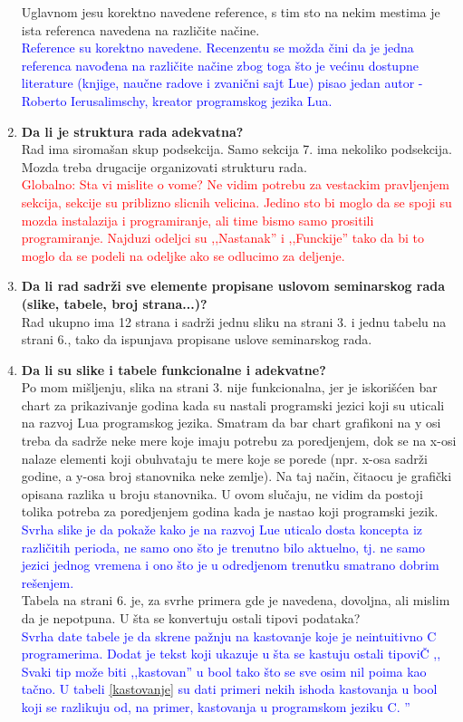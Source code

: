 \documentclass[a4paper]{report}
\newcommand{\odgovorAutora}[1]{\textcolor{blue}{#1}}
\newcommand{\note}[1]{\textcolor{red}{#1}}
\begin{document}
\begin{enumerate}
  Uglavnom jesu korektno navedene reference, s tim sto na nekim mestima je ista referenca navedena na razli\v cite na\v cine. \\
\odgovorAutora{Reference su korektno navedene. Recenzentu se možda čini da je jedna referenca navođena na različite načine zbog toga što je većinu dostupne literature (knjige, naučne radove i zvanični sajt Lue) pisao jedan autor - Roberto Ierusalimschy, kreator programskog jezika Lua.}
\item \textbf {Da li je struktura rada adekvatna?}\\
  Rad ima siroma\v san skup podsekcija. Samo sekcija 7. ima nekoliko podsekcija. Mozda treba drugacije organizovati strukturu rada. \\
\note{Globalno: Sta vi mislite o vome? Ne vidim potrebu za vestackim pravljenjem sekcija, sekcije su priblizno slicnih velicina. Jedino sto bi moglo da se spoji su mozda instalazija i programiranje, ali time bismo samo prositili programiranje. Najduzi odeljci su ,,Nastanak'' i ,,Funckije'' tako da bi to moglo da se podeli na odeljke ako se odlucimo za deljenje.}
\item \textbf {Da li rad sadrži sve elemente propisane uslovom seminarskog rada (slike, tabele, broj strana...)?}\\
  Rad ukupno ima 12 strana i sadr\v zi jednu sliku na strani 3. i jednu tabelu na strani 6., tako da ispunjava propisane uslove seminarskog rada.
\item \textbf {Da li su slike i tabele funkcionalne i adekvatne?}\\
  Po mom mi\v sljenju, slika na strani 3. nije funkcionalna, jer je iskori\v s\' cen bar chart za prikazivanje godina kada su nastali programski jezici koji su uticali na razvoj Lua programskog jezika. Smatram da bar chart grafikoni na y osi treba da sadr\v ze neke mere koje imaju potrebu za poredjenjem, dok se na x-osi nalaze elementi koji obuhvataju te mere koje se porede (npr. x-osa sadr\v zi godine, a y-osa broj stanovnika neke zemlje). Na taj na\v cin, \v citaocu je grafi\v cki opisana razlika u
    broju stanovnika. U ovom slu\v caju, ne vidim da postoji tolika potreba za poredjenjem godina kada je nastao koji programski jezik.\\
\odgovorAutora{Svrha slike je da pokaže kako je na razvoj Lue uticalo dosta koncepta iz različitih perioda, ne samo ono što je trenutno bilo aktuelno, tj. ne samo jezici jednog vremena i ono što je u odredjenom trenutku smatrano dobrim rešenjem.} \\
  Tabela na strani 6. je, za svrhe primera gde je navedena, dovoljna, ali mislim da je nepotpuna. U \v sta se konvertuju ostali tipovi podataka? \\
\odgovorAutora{Svrha date tabele je da skrene pažnju na kastovanje koje je neintuitivno C programerima. Dodat je tekst koji ukazuje u šta se kastuju ostali tipoviČ ,, Svaki tip može biti ,,kastovan'' u bool tako što se sve osim nil poima kao tačno. U tabeli \ref{kastovanje} su dati primeri nekih ishoda kastovanja u bool koji se razlikuju od, na primer, kastovanja u programskom jeziku C. ''}
\end{enumerate}
\end{document}
